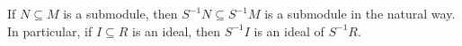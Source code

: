 If $N \subseteq M$ is a submodule, then $S^{-1}N \subseteq S^{-1}M$ is a submodule
in the natural way. In particular, if $I \subseteq R$ is an ideal, then
$S^{-1}I$ is an ideal of $S^{-1}R$.
